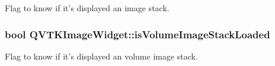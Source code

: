 Flag to know if it's displayed an image stack. 

\hypertarget{class_q_v_t_k_image_widget_a9d3b5fe40f1135532c480fdb2ca9239d}{
\subsubsection[{is\-Volume\-Image\-Stack\-Loaded}]{\setlength{\rightskip}{0pt plus 5cm}bool {\bf Q\-V\-T\-K\-Image\-Widget\-::is\-Volume\-Image\-Stack\-Loaded}}}\label{d8/dd7/class_q_v_t_k_image_widget_a9d3b5fe40f1135532c480fdb2ca9239d}


Flag to know if it's displayed an volume image stack. 

